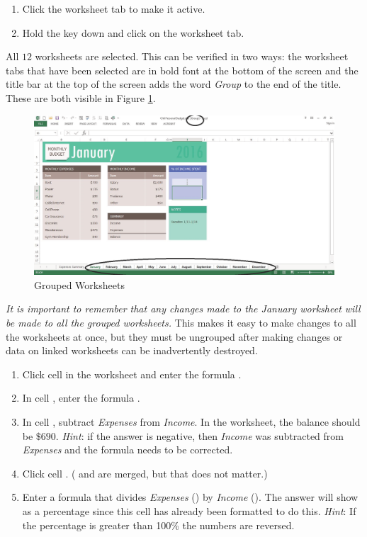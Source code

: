 \begin{enumerate}
	\item Click the  worksheet tab to make it active.
	\item Hold the  key down and click on the  worksheet tab.
\end{enumerate}

All $ 12 $ worksheets are selected. This can be verified in two ways: the worksheet tabs that have been selected are in bold font at the bottom of the screen and the title bar at the top of the screen adds the word \textit{Group} to the end of the title. These are both visible in Figure \ref{06:fig04}.

\begin{figure}[H]
	\centering
	\includegraphics[width=\maxwidth{.95\linewidth}]{gfx/ch06_fig04}
	\caption{Grouped Worksheets}
	\label{06:fig04}
\end{figure}

\textit{It is important to remember that any changes made to the January worksheet will be made to all the grouped worksheets.} This makes it easy to make changes to all the worksheets at once, but they must be ungrouped after making changes or data on linked worksheets can be inadvertently destroyed. 

\begin{enumerate}
	\item Click cell  in the  worksheet and enter the formula .
	\item In cell , enter the formula .
	\item In cell , subtract \textit{Expenses} from \textit{Income}. In the  worksheet, the balance should be $ \$690 $. \textit{Hint}: if the answer is negative, then \textit{Income} was subtracted from \textit{Expenses} and the formula needs to be corrected.
	\item Click cell . ( and  are merged, but that does not matter.)
	\item Enter a formula that divides \textit{Expenses} () by \textit{Income} (). The answer will show as a percentage since this cell has already been formatted to do this. \textit{Hint}: If the percentage is greater than 100\% the numbers are reversed.
\end{enumerate}

